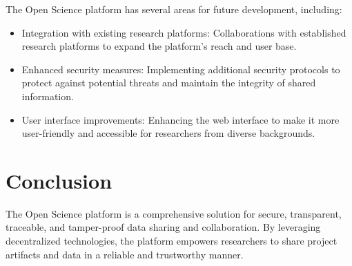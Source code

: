 \documentclass{article}
\begin{document}
The Open Science platform has several areas for future development, including:

\begin{itemize}
    \item Integration with existing research platforms: Collaborations with established research platforms to expand the platform's reach and user base.
    \item Enhanced security measures: Implementing additional security protocols to protect against potential threats and maintain the integrity of shared information.
    \item User interface improvements: Enhancing the web interface to make it more user-friendly and accessible for researchers from diverse backgrounds.
\end{itemize}

\section{Conclusion}
The Open Science platform is a comprehensive solution for secure, transparent, traceable, and tamper-proof data sharing and collaboration. By leveraging decentralized technologies, the platform empowers researchers to share project artifacts and data in a reliable and trustworthy manner.
\end{document}
